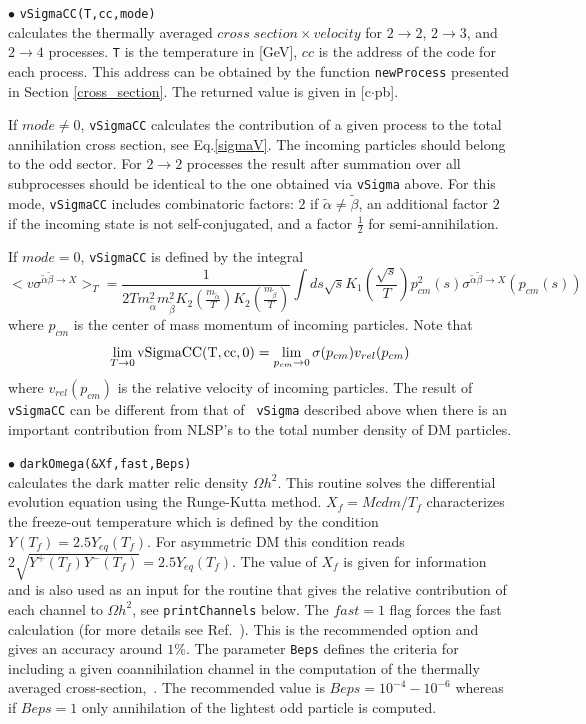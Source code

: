 \documentclass[12pt,a4paper]{article}
\begin{document}
 

\noindent
 $\bullet$    \verb|vSigmaCC(T,cc,mode)|\\
  calculates  the thermally  averaged  $cross\; section
\times velocity$ for $2\to2$, $2\to3$, and $2\to4$ processes. \verb|T| is the temperature in
[GeV],  $cc$ is the address of the code for each process. This address
can be obtained by the function {\tt newProcess} presented in  Section
\ref{cross_section}. The returned value  is given in [c$\cdot$pb]. 

 If $mode\ne 0$, \verb|vSigmaCC|  calculates  the contribution of a given
process to the total annihilation cross section,  see Eq.\ref{sigmaV}. The
 incoming particles should belong to the odd sector.  For $2\to2$ processes the result after summation over all subprocesses  should
be identical to the one obtained via {\tt vSigma}  above. For this mode,
\verb|vSigmaCC|  includes combinatoric factors: $2$ if $\tilde\alpha \ne
\tilde\beta$, an additional factor $2$ if the incoming state is not self-conjugated, and a factor
$\frac{1}{2}$  for semi-annihilation.   

If $mode=0$, {\tt vSigmaCC} is  defined by the integral
$$ <v \sigma^{\tilde\alpha\tilde\beta\to X}>_T=  \frac{1}{2 T
m_{\tilde\alpha}^2 m_{\tilde\beta}^2
K_2(\frac{m_{\tilde\alpha}}{T})K_2(\frac{m_{\tilde\beta}}{T})} \int ds \sqrt{s}
K_1(\frac{\sqrt{s}}{T})p_{cm}^2(s)\sigma^{\tilde\alpha\tilde\beta\to X}(p_{cm}(s))$$  
where $p_{cm}$ is the center of mass momentum of incoming particles.  Note that
$$\lim_{T\to 0} {\rm vSigmaCC(T,cc,0)}=\lim_{p_{cm}\to 0} \sigma(p_{cm}) v_{rel}(p_{cm}) $$ 
where   $v_{rel}(p_{cm})$ is the relative velocity of incoming particles.   The
result of {\tt vSigmaCC} can be different from that of {\tt
vSigma} described  above when there is an important contribution from NLSP's to the total
number density of DM particles. 
 
\noindent 
$\bullet$ \verb|darkOmega(&Xf,fast,Beps)|\\
calculates the dark matter relic density $\Omega h^2$. 
This routine  solves the differential evolution equation  using the Runge-Kutta method. 
$X_f=Mcdm/T_{f}$
characterizes the freeze-out temperature  which is defined by the
condition $Y(T_f)=2.5Y_{eq}(T_f)$. For  asymmetric  DM this condition
reads $2\sqrt{Y^+(T_f)Y^-(T_f)}=2.5Y_{eq}(T_f)$.  The value of $X_f$ is given for
information and is also used as an input for the routine that
gives the relative contribution of each channel to $\Omega h^2$,
see \verb|printChannels|  below. The  $fast=1$ flag forces the
fast calculation (for more details see
Ref.~\cite{Belanger:2004yn}). This is the recommended option and
gives an accuracy around $1\%$. The parameter {\tt Beps} defines the
criteria for including a given coannihilation channel in the computation of the
thermally averaged cross-section,~\cite{Belanger:2004yn}.   The
recommended value is $Beps=10^{-4} - 10^{-6}$ whereas 
if $Beps=1$ only annihilation of the
lightest odd particle is computed.
   
\end{document}
